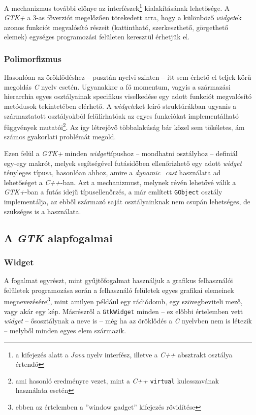 A mechanizmus további előnye az interfészek\footnote{a kifejezés alatt a \textit{Java} nyelv interfész, illetve a \textit{C++} absztrakt osztálya értendő} kialakításának lehetősége. A \textit{GTK+} a 3-as főverziót megelőzően törekedett arra, hogy a különböző \textit{widget}ek azonos funkciót megvalósító részeit (kattintható, szerkeszthető, görgethető elemek) egységes programozási felületen keresztül érhetjük el.

\subsubsection{Polimorfizmus}

Hasonlóan az öröklődéshez -- pusztán nyelvi szinten -- itt sem érhető el teljek körű megoldás \textit{C} nyelv esetén. Ugyanakkor a fő momentum, vagyis a származási hierarchia egyes osztályainak specifikus viselkedése egy adott funkciót megvalósító metódusok tekintetében elérhető. A \textit{widget}eket leíró struktúrákban ugyanis a származtatott osztályokból felülírhatóak az egyes funkciókat implementálható függvények mutatói\footnote{ami hasonló eredményre vezet, mint a \textit{C++} \texttt{virtual} kulcsszavának használata esetén}. Az így létrejövő többalakúság bár közel sem tökéletes, ám számos gyakorlati problémát megold.

Ezen felül a \textit{GTK+} minden \textit{widget}típushoz -- mondhatni osztályhoz -- definiál egy-egy makrót, melyek segítségével futásidőben ellenőrizhető egy adott \textit{widget} tényleges típusa, hasonlóan ahhoz, amire a \textit{dynamic\_cast} használata ad lehetőséget a \textit{C++}-ban. Azt a mechanizmust, melynek révén lehetővé válik a \textit{GTK+}-ban a futás idejű típusellenőrzés, a már említett \texttt{GObject} osztály implementálja, az ebből származó saját osztályainknak nem csupán lehetséges, de szükséges is a használata.

\subsection{A \textit{GTK} alapfogalmai}

\subsubsection{Widget}

A fogalmat egyrészt, mint gyűjtőfogalmat használjuk a grafikus felhasználói felületek programozása során a felhasználó felületek egyes grafikai elemeinek megnevezésére\footnote{ebben az értelemben a ''window gadget'' kifejezés rövidítése}, mint amilyen például egy rádiódomb, egy szövegbeviteli mező, vagy akár egy kép.  Másrészről a \texttt{GtkWidget} minden -- ez előbbi értelemben vett \textit{widget} -- ősosztálynak a neve is -- még ha az öröklődés a \textit{C} nyelvben nem is létezik -- melyből minden egyes elem származik.

